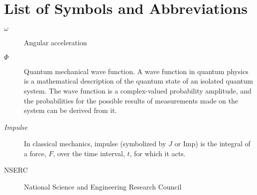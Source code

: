 \section*{List of Symbols and Abbreviations}
\begin{description}
\item[$\omega$]{Angular acceleration}
\item[$\Phi$]{Quantum mechanical wave function.  A wave function in quantum physics is a mathematical description of the quantum state of an isolated quantum system. The wave function is a complex-valued probability amplitude, and the probabilities for the possible results of measurements made on the system can be derived from it.}
\item[\emph{Impulse}]{In classical mechanics, impulse (symbolized by $J$ or Imp) is the integral of a force, $F$, over the time interval, $t$, for which it acts.}
\item[NSERC]{National Science and Engineering Research Council}
\end{description}
